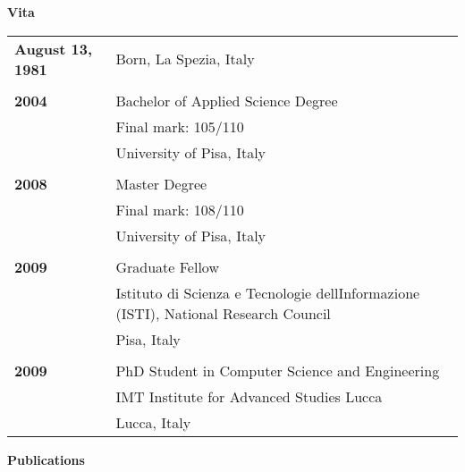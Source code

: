 \documentclass[final,10pt,a5paper]{phdimt}
\theoremstyle{definition}
\begin{document}
\begin{center}
\vspace*{0.5cm}
{\Large \bf  Vita}
\end{center}
\begin{table}[h!]
\begin{center}
\renewcommand{\arraystretch}{1.25}
\begin{tabular*}{1\textwidth}{l p{8.5cm}}


{\bf August 13, 1981} & Born, La Spezia, Italy \\
& \\
{\bf 2004} & Bachelor of Applied Science Degree \\  
& Final mark: 105/110\\
& University of Pisa, Italy \\
& \\
{\bf 2008} & Master Degree\\  
& Final mark: 108/110\\
& University of Pisa, Italy \\
& \\
{\bf 2009} & Graduate Fellow\\  
& Istituto di Scienza e Tecnologie dellInformazione (ISTI), National Research Council\\
& Pisa, Italy \\
& \\
{\bf 2009} & PhD Student in Computer Science and Engineering \\  
& IMT Institute for Advanced Studies Lucca \\
& Lucca, Italy\\



\end{tabular*}
\end{center}
\end{table}
\clearpage
\begin{center}
\vspace*{0.5cm}
{\Large \bf  Publications}
\end{center}
\vspace*{0.5cm}
\end{document}
